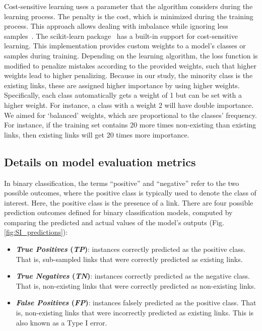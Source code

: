 \documentclass[oneside, a4paper, onecolumn, 11pt]{article}
\begin{document}
\begin{refsection}
Cost-sensitive learning uses a parameter that the algorithm considers during the learning process. The penalty is the cost, which is minimized during the training process. This approach allows dealing with imbalance while ignoring less samples~\autocite{Lopez2012-uw}. The scikit-learn package~\autocite{Pedregosa2011-bw} has a built-in support for cost-sensitive learning. This implementation provides custom weights to a model's classes or samples during training. Depending on the learning algorithm, the loss function is modified to penalize mistakes according to the provided weights, such that higher weights lead to higher penalizing. Because in our study, the minority class is the existing links, these are assigned higher importance by using higher weights. Specifically, each class automatically gets a weight of 1 but can be set with a higher weight. For instance, a class with a weight 2 will have double importance. We aimed for `balanced' weights, which are proportional to the classes' frequency. For instance, if the training set contains 20 more times non-existing than existing links, then existing links will get 20 times more importance.

\subsection*{Details on model evaluation metrics}  \label{sec:SI_evaluation}
In binary classification, the terms ``positive'' and ``negative'' refer to the two possible outcomes, where the positive class is typically used to denote the class of interest. Here, the positive class is the presence of a link. There are four possible prediction outcomes defined for binary classification models, computed by comparing the predicted and actual values of the model's outputs (Fig. \ref{fig:SI_predictions}):

\begin{itemize}
    \item \textbf{\textit{True Positives} (\textit{TP})}: instances correctly predicted as the positive class. That is, sub-sampled links that were correctly predicted as existing links.

    \item \textbf{\textit{True Negatives} (\textit{TN})}: instances correctly predicted as the negative class. That is, non-existing links that were correctly predicted as non-existing links.

    \item \textbf{\textit{False Positives} (\textit{FP})}: instances falsely predicted as the positive class. That is, non-existing links that were incorrectly predicted as existing links. This is also known as a Type I error. 


\end{itemize}
\end{refsection}
\end{document}
